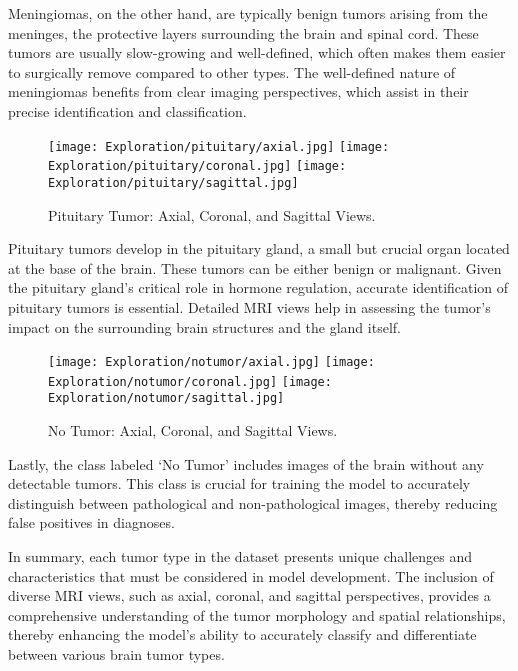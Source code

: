 Meningiomas, on the other hand, are typically benign tumors arising from the meninges, the protective layers surrounding the brain and spinal cord. These tumors are usually slow-growing and well-defined, which often makes them easier to surgically remove compared to other types. The well-defined nature of meningiomas benefits from clear imaging perspectives, which assist in their precise identification and classification.

\begin{figure}[H]
  \begin{center}
    \texttt{[image: Exploration/pituitary/axial.jpg]}
    \texttt{[image: Exploration/pituitary/coronal.jpg]}
    \texttt{[image: Exploration/pituitary/sagittal.jpg]}
  \end{center}
  \caption{Pituitary Tumor: Axial, Coronal, and Sagittal Views.}\label{fig:pituitary_views}
\end{figure}

Pituitary tumors develop in the pituitary gland, a small but crucial organ located at the base of the brain. These tumors can be either benign or malignant. Given the pituitary gland's critical role in hormone regulation, accurate identification of pituitary tumors is essential. Detailed MRI views help in assessing the tumor's impact on the surrounding brain structures and the gland itself.

\begin{figure}[H]
  \begin{center}
    \texttt{[image: Exploration/notumor/axial.jpg]}
    \texttt{[image: Exploration/notumor/coronal.jpg]}
    \texttt{[image: Exploration/notumor/sagittal.jpg]}
  \end{center}
  \caption{No Tumor: Axial, Coronal, and Sagittal Views.}\label{fig:notumor_views}
\end{figure}

Lastly, the class labeled `No Tumor' includes images of the brain without any detectable tumors. This class is crucial for training the model to accurately distinguish between pathological and non-pathological images, thereby reducing false positives in diagnoses.

In summary, each tumor type in the dataset presents unique challenges and characteristics that must be considered in model development. The inclusion of diverse MRI views, such as axial, coronal, and sagittal perspectives, provides a comprehensive understanding of the tumor morphology and spatial relationships, thereby enhancing the model's ability to accurately classify and differentiate between various brain tumor types.


